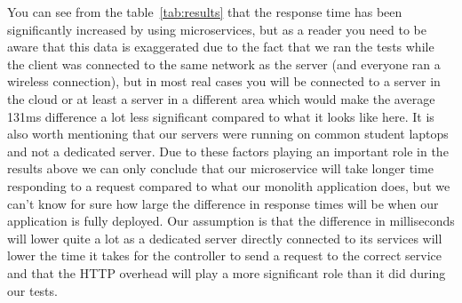 \noindent You can see from the table~\ref{tab:results} that the response time has been significantly increased by using microservices, but as a reader you need to be aware that this data is exaggerated due to the fact that we ran the tests while the client was connected to the same network as the server (and everyone ran a wireless connection), but in most real cases you will be connected to a server in the cloud or at least a server in a different area which would make the average 131ms difference a lot less significant compared to what it looks like here. It is also worth mentioning that our servers were running on common student laptops and not a dedicated server. Due to these factors playing an important role in the results above we can only conclude that our microservice will take longer time responding to a request compared to what our monolith application does, but we can’t know for sure how large the difference in response times will be when our application is fully deployed. Our assumption is that the difference in milliseconds will lower quite a lot as a dedicated server directly connected to its services will lower the time it takes for the controller to send a request to the correct service and that the HTTP overhead will play a more significant role than it did during our tests.
